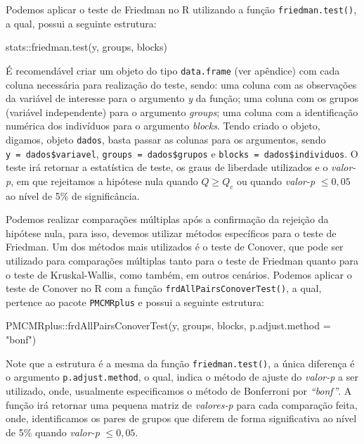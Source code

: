 \documentclass[
  letterpaper,
  DIV=11,
  numbers=noendperiod]{scrreprt}
\newenvironment{Shaded}{\begin{snugshade}}{\end{snugshade}}
\newcommand{\AttributeTok}[1]{\textcolor[rgb]{0.40,0.45,0.13}{#1}}
\newcommand{\FunctionTok}[1]{\textcolor[rgb]{0.28,0.35,0.67}{#1}}
\newcommand{\NormalTok}[1]{\textcolor[rgb]{0.00,0.23,0.31}{#1}}
\newcommand{\SpecialCharTok}[1]{\textcolor[rgb]{0.37,0.37,0.37}{#1}}
\newcommand{\StringTok}[1]{\textcolor[rgb]{0.13,0.47,0.30}{#1}}
\begin{document}
Podemos aplicar o teste de Friedman no R utilizando a função
\texttt{friedman.test()}, a qual, possui a seguinte estrutura:

\begin{Shaded}
\begin{Highlighting}[]
\NormalTok{stats}\SpecialCharTok{::}\FunctionTok{friedman.test}\NormalTok{(y, groups, blocks)}
\end{Highlighting}
\end{Shaded}

É recomendável criar um objeto do tipo \texttt{data.frame} (ver
apêndice) com cada coluna necessária para realização do teste, sendo:
uma coluna com as observações da variável de interesse para o argumento
\emph{y} da função; uma coluna com os grupos (variável independente)
para o argumento \emph{groups}; uma coluna com a identificação numérica
dos indivíduos para o argumento \emph{blocks}. Tendo criado o objeto,
digamos, objeto \texttt{dados}, basta passar as colunas para os
argumentos, sendo \texttt{y\ =\ dados\$variavel},
\texttt{groups\ =\ dados\$grupos} e
\texttt{blocks\ =\ dados\$individuos}. O teste irá retornar a
estatística de teste, os graus de liberdade utilizados e o
\emph{valor-p}, em que rejeitamos a hipótese nula quando \(Q \geq Q_c\)
ou quando \emph{valor-p} \(\leq 0,05\) ao nível de 5\% de significância.

Podemos realizar comparações múltiplas após a confirmação da rejeição da
hipótese nula, para isso, devemos utilizar métodos específicos para o
teste de Friedman. Um dos métodos mais utilizados é o teste de Conover,
que pode ser utilizado para comparações múltiplas tanto para o teste de
Friedman quanto para o teste de Kruskal-Wallis, como também, em outros
cenários. Podemos aplicar o teste de Conover no R com a função
\texttt{frdAllPairsConoverTest()}, a qual, pertence ao pacote
\texttt{PMCMRplus} e possui a seguinte estrutura:

\begin{Shaded}
\begin{Highlighting}[]
\NormalTok{PMCMRplus}\SpecialCharTok{::}\FunctionTok{frdAllPairsConoverTest}\NormalTok{(y, groups, blocks, }\AttributeTok{p.adjust.method =} \StringTok{"bonf"}\NormalTok{)}
\end{Highlighting}
\end{Shaded}

Note que a estrutura é a mesma da função \texttt{friedman.test()}, a
única diferença é o argumento \texttt{p.adjust.method}, o qual, indica o
método de ajuste do \emph{valor-p} a ser utilizado, onde, usualmente
especificamos o método de Bonferroni por \emph{``bonf''}. A função irá
retornar uma pequena matriz de \emph{valores-p} para cada comparação
feita, onde, identificamos os pares de grupos que diferem de forma
significativa ao nível de 5\% quando \emph{valor-p} \(\leq 0,05\).
\end{document}
